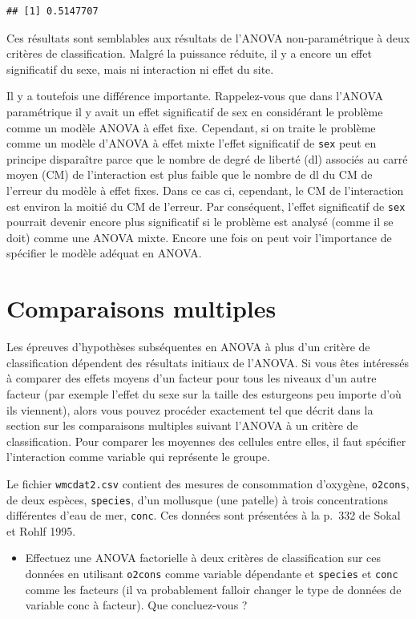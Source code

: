 \documentclass[12pt,]{book}
\providecommand{\tightlist}{%
  \setlength{\itemsep}{0pt}\setlength{\parskip}{0pt}}
\begin{document}
\begin{verbatim}
## [1] 0.5147707
\end{verbatim}

Ces résultats sont semblables aux résultats de l'ANOVA non-paramétrique à deux critères de classification. Malgré la puissance réduite, il y a encore un effet significatif du sexe, mais ni interaction ni effet du site.

Il y a toutefois une différence importante. Rappelez-vous que dans l'ANOVA paramétrique il y avait un effet significatif de sex en considérant le problème comme un modèle ANOVA à effet fixe. Cependant, si on traite le problème comme un modèle d'ANOVA à effet mixte l'effet significatif de \texttt{sex} peut en principe disparaître parce que le nombre de degré de liberté (dl) associés au carré moyen (CM) de l'interaction est plus faible que le nombre de dl du CM de l'erreur du modèle à effet fixes. Dans ce cas ci, cependant, le CM de l'interaction est environ la moitié du CM de l'erreur. Par conséquent, l'effet significatif de \texttt{sex} pourrait devenir encore plus significatif si le problème est analysé (comme il se doit) comme une ANOVA mixte. Encore une fois on peut voir l'importance de spécifier le modèle adéquat en ANOVA.

\hypertarget{comparaisons-multiples}{%
\section{Comparaisons multiples}\label{comparaisons-multiples}}

Les épreuves d'hypothèses subséquentes en ANOVA à plus d'un critère de classification dépendent des résultats initiaux de l'ANOVA. Si vous êtes intéressés à comparer des effets moyens d'un facteur pour tous les niveaux d'un autre facteur (par exemple l'effet du sexe sur la taille des esturgeons peu importe d'où ils viennent), alors vous pouvez procéder exactement tel que décrit dans la section sur les comparaisons multiples suivant l'ANOVA à un critère de classification. Pour comparer les moyennes des cellules entre elles, il faut spécifier l'interaction comme variable qui représente le groupe.

Le fichier \texttt{wmcdat2.csv} contient des mesures de consommation d'oxygène, \texttt{o2cons}, de deux espèces, \texttt{species}, d'un mollusque (une patelle) à trois concentrations différentes d'eau de mer, \texttt{conc}. Ces données sont présentées à la p.~332 de Sokal et Rohlf 1995.

\begin{itemize}
\tightlist
\item
  Effectuez une ANOVA factorielle à deux critères de classification sur ces données en utilisant \texttt{o2cons} comme variable dépendante et \texttt{species} et \texttt{conc} comme les facteurs (il va probablement falloir changer le type de données de variable conc à facteur). Que concluez-vous ?
\end{itemize}
\end{document}
